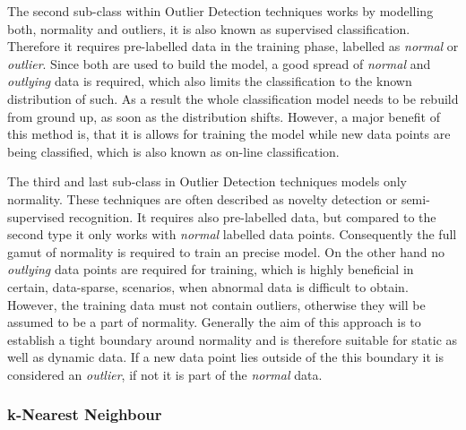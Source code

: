 The second sub-class within Outlier Detection techniques works by modelling both, normality and outliers, it is also known as supervised classification.
Therefore it requires pre-labelled data in the training phase, labelled as \emph{normal} or \emph{outlier}. Since both are used to build the model, a good spread of \emph{normal} and \emph{outlying} data is required, which also limits the classification to the known distribution of such.
As a result the whole classification model needs to be rebuild from ground up, as soon as the distribution shifts.
However, a major benefit of this method is, that it is allows for training the model while new data points are being classified, which is also known as on-line classification. \parencite[cf.][]{Hodge2004}

The third and last sub-class in Outlier Detection techniques models only normality. These techniques are often described as novelty detection or semi-supervised recognition.
It requires also pre-labelled data, but compared to the second type it only works with \emph{normal} labelled data points. Consequently the full gamut of normality is required to train an precise model. On the other hand no \emph{outlying} data points are required for training, which is highly beneficial in certain, data-sparse, scenarios, when abnormal data is difficult to obtain.
However, the training data must not contain outliers, otherwise they will be assumed to be a part of normality.
Generally the aim of this approach is to establish a tight boundary around normality and is therefore suitable for static as well as dynamic data.
If a new data point lies outside of the this boundary it is considered an \emph{outlier}, if not it is part of the \emph{normal} data.

\subsubsection{k-Nearest Neighbour}
\label{sec:background:network:novelty:knn}

